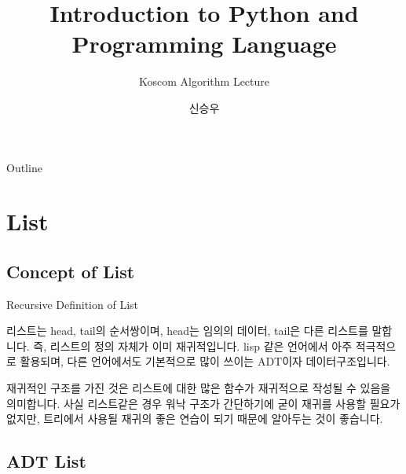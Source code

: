 \documentclass{beamer}
\title{Introduction to Python and Programming Language}
\subtitle{Koscom Algorithm Lecture}
\author{신승우}
\begin{document}
\begin{frame}
  \titlepage
\end{frame}

\begin{frame}{Outline}
  \tableofcontents
\end{frame}



\section{List} 

\subsection{Concept of List} 
\begin{frame}{Recursive Definition of List} 

리스트는 head, tail의 순서쌍이며, head는 임의의 데이터, tail은 다른 리스트를 말합니다. 즉, 리스트의 정의 자체가 이미 재귀적입니다. lisp 같은 언어에서 아주 적극적으로 활용되며, 다른 언어에서도 기본적으로 많이 쓰이는 ADT이자 데이터구조입니다. 

재귀적인 구조를 가진 것은 리스트에 대한 많은 함수가 재귀적으로 작성될 수 있음을 의미합니다. 사실 리스트같은 경우 워낙 구조가 간단하기에 굳이 재귀를 사용할 필요가 없지만, 트리에서 사용될 재귀의 좋은 연습이 되기 때문에 알아두는 것이 좋습니다. 

\end{frame}

\subsection{ADT List}
\end{document}
